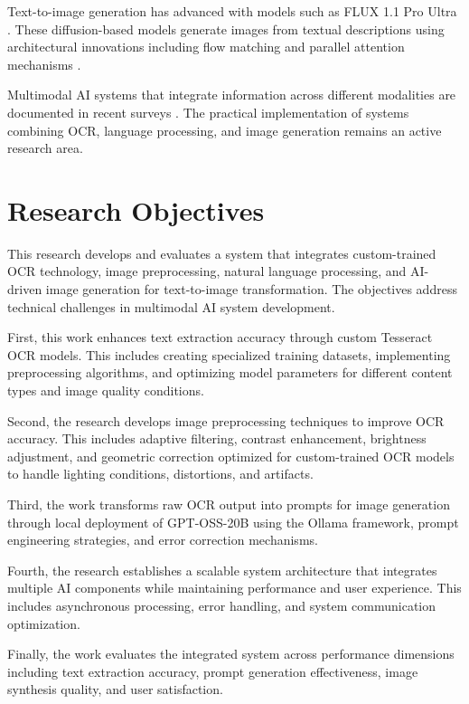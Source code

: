 Text-to-image generation has advanced with models such as FLUX 1.1 Pro Ultra \cite{blackforestlabs2024flux}. These diffusion-based models generate images from textual descriptions using architectural innovations including flow matching and parallel attention mechanisms \cite{rombach2025flux}.

Multimodal AI systems that integrate information across different modalities are documented in recent surveys \cite{qin2024comprehensive, jin2024mm}. The practical implementation of systems combining OCR, language processing, and image generation remains an active research area.

\section{Research Objectives}

This research develops and evaluates a system that integrates custom-trained OCR technology, image preprocessing, natural language processing, and AI-driven image generation for text-to-image transformation. The objectives address technical challenges in multimodal AI system development.

First, this work enhances text extraction accuracy through custom Tesseract OCR models. This includes creating specialized training datasets, implementing preprocessing algorithms, and optimizing model parameters for different content types and image quality conditions.

Second, the research develops image preprocessing techniques to improve OCR accuracy. This includes adaptive filtering, contrast enhancement, brightness adjustment, and geometric correction optimized for custom-trained OCR models to handle lighting conditions, distortions, and artifacts.

Third, the work transforms raw OCR output into prompts for image generation through local deployment of GPT-OSS-20B using the Ollama framework, prompt engineering strategies, and error correction mechanisms.

Fourth, the research establishes a scalable system architecture that integrates multiple AI components while maintaining performance and user experience. This includes asynchronous processing, error handling, and system communication optimization.

Finally, the work evaluates the integrated system across performance dimensions including text extraction accuracy, prompt generation effectiveness, image synthesis quality, and user satisfaction.

